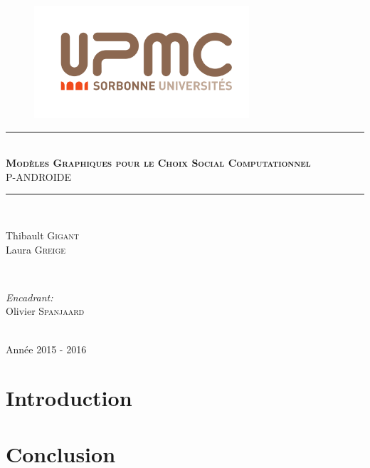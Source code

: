 \documentclass[11pt, letterpaper]{article}
\newcommand{\hmark}{\rule{\linewidth}{0.5mm}}
\begin{document}
\begin{titlepage}

\centering

\begin{figure}[t]
\begin{center}
\includegraphics[width=8cm]{upmc.png}
\end{center}
\end{figure}

\hmark \\[0.5cm]
\textsc{\textbf{\Large Mod\`{e}les Graphiques pour le Choix Social Computationnel}} \\[0.5cm]
\textsc{P-ANDROIDE} \\[0.5cm]
\hmark \\[5cm]

\begin{minipage}{0.4\textwidth}
\begin{flushleft}
Thibault \textsc{Gigant}\\
Laura \textsc{Greige}
\end{flushleft}
\end{minipage}
~
\begin{minipage}{0.4\textwidth}
\begin{flushright} \large
\emph{Encadrant:}\\
Olivier \textsc{Spanjaard}
\end{flushright}
\end{minipage}\\[4cm]

\large Ann\'{e}e 2015 - 2016

\end{titlepage}
\newpage

\tableofcontents

\newpage


\pagestyle{fancy}
\renewcommand{\headrulewidth}{1pt}

\section*{Introduction}

\newpage

\section*{Conclusion}
\end{document}
